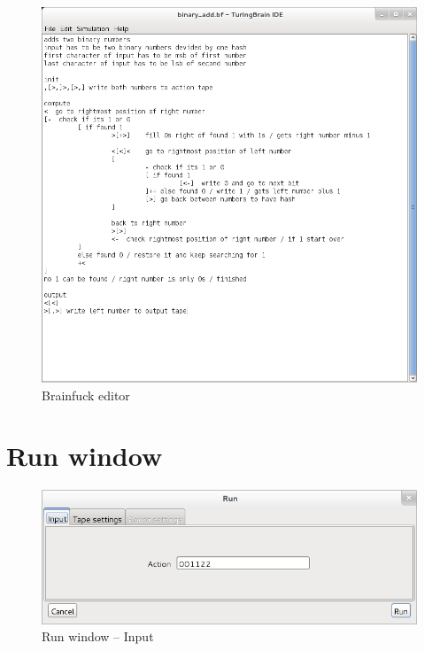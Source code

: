 \documentclass[%
  a4paper,%
  11pt,%
  blue,%
  hyperref	%
  ]{tubsartcl}
\begin{document}
\begin{figure}[!htb]
\begin{center}
\includegraphics[scale=0.5]{graphics_gui/brainfuck_editor.png}
\end{center}
\caption{Brainfuck editor}
\label{pic:brainfuck_editor}
\end{figure}

\newpage

\section{Run window}

\begin{figure}[!htb]
\begin{center}
\includegraphics[scale=0.5]{graphics_gui/run_window_input.png}
\end{center}
\caption{Run window -- Input}
\label{pic:run_window_input}
\end{figure}
\end{document}
